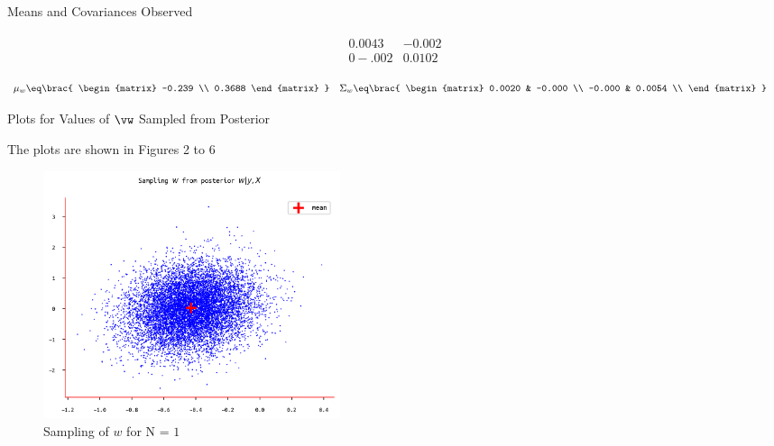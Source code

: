 \documentclass{article}
\begin{document}
\begin{question}
\begin{qsection}{Means and Covariances Observed}
\begin{enumerate}
\begin{align*}
{\begin{matrix}
							0.0043 &	-0.002	\\
							0-.002 &	0.0102	\\
						\end{matrix}
					}
				\end{align*}
			\ditem[N = 20]
				\begin{align*}
					\mu_w		&\eq	\brac{
						\begin{matrix}
							-0.239 \\
							0.3688
						\end{matrix}
					} &
					\Sigma_w	&\eq	\brac{
						\begin{matrix}
							0.0020 &	-0.000	\\
							-0.000 &	0.0054	\\
						\end{matrix}
					}
				\end{align*}
		\end{enumerate}

	\end{qsection}

	\begin{qsection}{Plots for Values of $\vw$ Sampled from Posterior}

		The plots are shown in Figures 2 to 6

		\begin{figure}[h!]
			\centering
			\includegraphics[height=275px]{includes/plots/q4b/posterior-samples-1.png}
			\caption{Sampling of $w$ for N = $1$}
		\end{figure}


\end{qsection}
\end{question}
\end{document}
